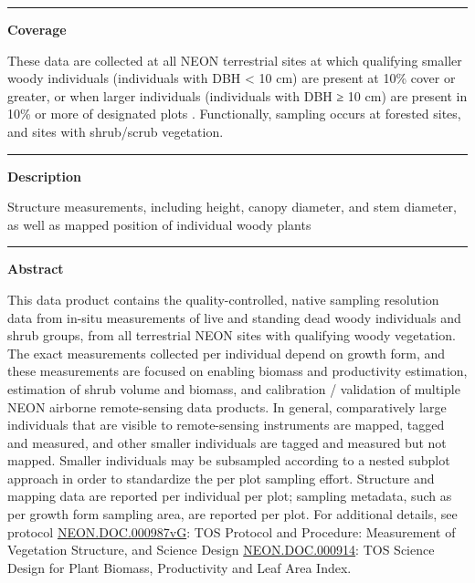 \documentclass[]{article}
\begin{document}
\begin{center}\rule{0.5\linewidth}{\linethickness}\end{center}

\textbf{Coverage}

These data are collected at all NEON terrestrial sites at which
qualifying smaller woody individuals (individuals with DBH \textless{}
10 cm) are present at 10\% cover or greater, or when larger individuals
(individuals with DBH ≥ 10 cm) are present in 10\% or more of designated
plots . Functionally, sampling occurs at forested sites, and sites with
shrub/scrub vegetation.

\begin{center}\rule{0.5\linewidth}{\linethickness}\end{center}

\textbf{Description}

Structure measurements, including height, canopy diameter, and stem
diameter, as well as mapped position of individual woody plants

\begin{center}\rule{0.5\linewidth}{\linethickness}\end{center}

\textbf{Abstract}

This data product contains the quality-controlled, native sampling
resolution data from in-situ measurements of live and standing dead
woody individuals and shrub groups, from all terrestrial NEON sites with
qualifying woody vegetation. The exact measurements collected per
individual depend on growth form, and these measurements are focused on
enabling biomass and productivity estimation, estimation of shrub volume
and biomass, and calibration / validation of multiple NEON airborne
remote-sensing data products. In general, comparatively large
individuals that are visible to remote-sensing instruments are mapped,
tagged and measured, and other smaller individuals are tagged and
measured but not mapped. Smaller individuals may be subsampled according
to a nested subplot approach in order to standardize the per plot
sampling effort. Structure and mapping data are reported per individual
per plot; sampling metadata, such as per growth form sampling area, are
reported per plot. For additional details, see protocol
\href{http://data.neonscience.org/api/v0/documents/NEON.DOC.000987vG}{NEON.DOC.000987vG}:
TOS Protocol and Procedure: Measurement of Vegetation Structure, and
Science Design
\href{http://data.neonscience.org/api/v0/documents/NEON.DOC.000914vA}{NEON.DOC.000914}:
TOS Science Design for Plant Biomass, Productivity and Leaf Area Index.
\end{document}
